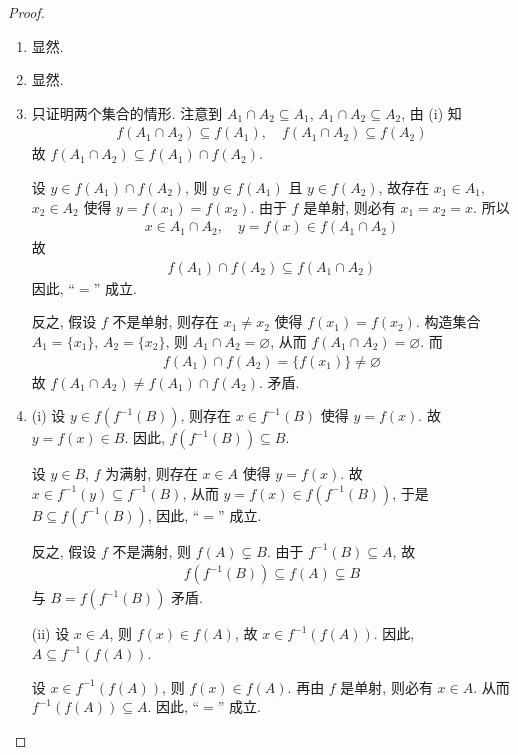 \documentclass[../../main.tex]{subfiles}%
\begin{document}
\begin{proof}
\begin{enumerate}[(1)]
\item 显然.

\item 显然.

\item 只证明两个集合的情形. 注意到 $A_1 \cap A_2 \subseteq A_1$, $A_1 \cap A_2 \subseteq A_2$, 由 (i) 知
\begin{align*}
f(A_1 \cap A_2) \subseteq f(A_1), \quad f(A_1 \cap A_2) \subseteq f(A_2)
\end{align*}
故 $f(A_1 \cap A_2) \subseteq f(A_1) \cap f(A_2)$.

设 $y \in f(A_1) \cap f(A_2)$, 则 $y \in f(A_1)$ 且 $y \in f(A_2)$, 故存在 $x_1 \in A_1$, $x_2 \in A_2$ 使得 $y = f(x_1) = f(x_2)$. 由于 $f$ 是单射, 则必有 $x_1 = x_2 = x$. 所以
\begin{align*}
x \in A_1 \cap A_2, \quad y = f(x) \in f(A_1 \cap A_2)
\end{align*}
故
\begin{align*}
f(A_1) \cap f(A_2) \subseteq f(A_1 \cap A_2)
\end{align*}
因此, “$=$” 成立.

反之, 假设 $f$ 不是单射, 则存在 $x_1 \neq x_2$ 使得 $f(x_1) = f(x_2)$. 构造集合 $A_1 = \{x_1\}$, $A_2 = \{x_2\}$, 则 $A_1 \cap A_2 = \varnothing$, 从而 $f(A_1 \cap A_2) = \varnothing$. 而
\begin{align*}
f(A_1) \cap f(A_2) = \{f(x_1)\} \neq \varnothing
\end{align*}
故 $f(A_1 \cap A_2) \neq f(A_1) \cap f(A_2)$. 矛盾.

\item (i) 设 $y \in f(f^{-1}(B))$, 则存在 $x \in f^{-1}(B)$ 使得 $y = f(x)$. 故 $y = f(x) \in B$. 因此, $f(f^{-1}(B)) \subseteq B$.

设 $y \in B$, $f$ 为满射, 则存在 $x \in A$ 使得 $y = f(x)$. 故 $x \in f^{-1}(y) \subseteq f^{-1}(B)$, 从而 $y = f(x) \in f(f^{-1}(B))$, 于是 $B \subseteq f(f^{-1}(B))$, 因此, “$=$” 成立.

反之, 假设 $f$ 不是满射, 则 $f(A) \subsetneq B$. 由于 $f^{-1}(B) \subseteq A$, 故
\begin{align*}
f(f^{-1}(B)) \subseteq f(A) \subsetneq B
\end{align*}
与 $B = f(f^{-1}(B))$ 矛盾.

(ii) 设 $x \in A$, 则 $f(x) \in f(A)$, 故 $x \in f^{-1}(f(A))$. 因此, $A \subseteq f^{-1}(f(A))$.

设 $x \in f^{-1}(f(A))$, 则 $f(x) \in f(A)$. 再由 $f$ 是单射, 则必有 $x \in A$. 从而 $f^{-1}(f(A)) \subseteq A$. 因此, “$=$” 成立.


\end{enumerate}
\end{proof}
\end{document}
